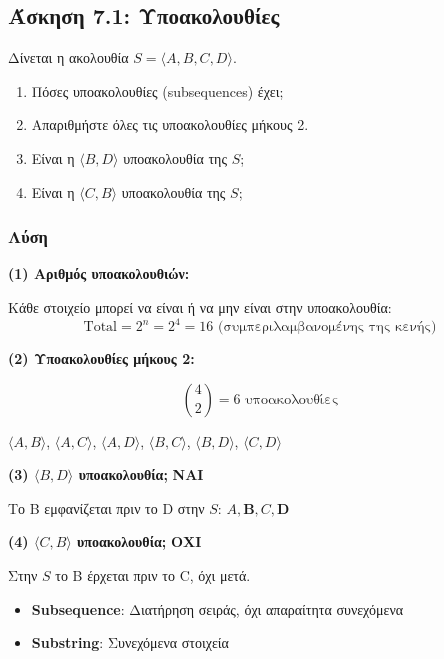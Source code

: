 \subsection{Άσκηση 7.1: Υποακολουθίες}

\begin{formulabox}[Εκφώνηση]
Δίνεται η ακολουθία $S = \langle A, B, C, D \rangle$.

\begin{enumerate}
    \item Πόσες υποακολουθίες (subsequences) έχει;
    \item Απαριθμήστε όλες τις υποακολουθίες μήκους 2.
    \item Είναι η $\langle B, D \rangle$ υποακολουθία της $S$;
    \item Είναι η $\langle C, B \rangle$ υποακολουθία της $S$;
\end{enumerate}
\end{formulabox}

\subsubsection*{Λύση}

\textbf{(1) Αριθμός υποακολουθιών:}

Κάθε στοιχείο μπορεί να είναι ή να μην είναι στην υποακολουθία:
$$\text{Total} = 2^n = 2^4 = 16 \text{ (συμπεριλαμβανομένης της κενής)}$$

\textbf{(2) Υποακολουθίες μήκους 2:}

$$\binom{4}{2} = 6 \text{ υποακολουθίες}$$

$\langle A, B \rangle$, $\langle A, C \rangle$, $\langle A, D \rangle$,
$\langle B, C \rangle$, $\langle B, D \rangle$, $\langle C, D \rangle$

\textbf{(3) $\langle B, D \rangle$ υποακολουθία;} \textbf{ΝΑΙ}

Το B εμφανίζεται πριν το D στην $S$: $A, \mathbf{B}, C, \mathbf{D}$

\textbf{(4) $\langle C, B \rangle$ υποακολουθία;} \textbf{ΟΧΙ}

Στην $S$ το B έρχεται πριν το C, όχι μετά.

\begin{infobox}
\begin{itemize}
    \item \textbf{Subsequence}: Διατήρηση σειράς, όχι απαραίτητα συνεχόμενα
    \item \textbf{Substring}: Συνεχόμενα στοιχεία
\end{itemize}
\end{infobox}

